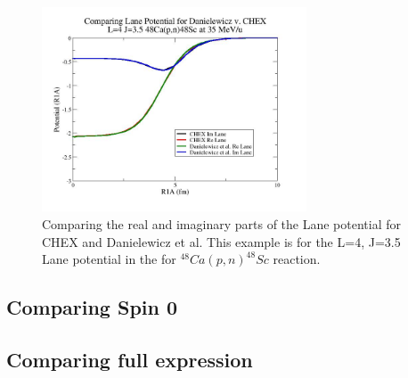 \documentclass{article}
\begin{document}
\begin{figure}[H]
	\centering 
    \includegraphics[width=0.7\textwidth]{ComparingLaneFigure.jpg}
    \caption{Comparing the real and imaginary parts of the Lane potential for CHEX and Danielewicz et al.  This example is for the L=4, J=3.5 Lane potential in the for $^{48}Ca(p,n)^{48}Sc$ reaction.}
    \label{fig:imwfcompare}
\end{figure}

\subsection{Comparing Spin 0}

\subsection{Comparing full expression}





\end{document}
